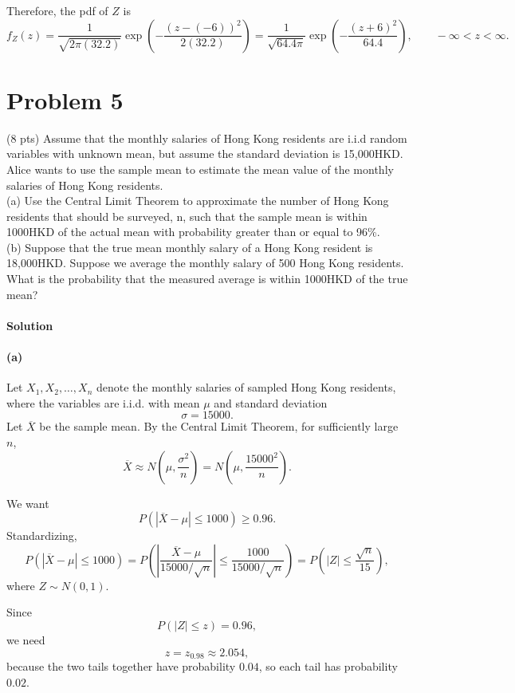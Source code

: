 \documentclass[a4paper,10pt]{article}
\begin{document}
Therefore, the pdf of $Z$ is
\[
f_Z(z)=\frac{1}{\sqrt{2\pi(32.2)}}
\exp\left(-\frac{(z-(-6))^2}{2(32.2)}\right)
=\frac{1}{\sqrt{64.4\pi}}
\exp\left(-\frac{(z+6)^2}{64.4}\right),
\qquad -\infty<z<\infty.
\]



\section{Problem 5}\label{pro:5}
(8 pts) Assume that the monthly salaries of Hong Kong residents are i.i.d random variables
with unknown mean, but assume the standard deviation is 15,000HKD. Alice wants to use the
sample mean to estimate the mean value of the monthly salaries of Hong Kong residents.\\
(a) Use the Central Limit Theorem to approximate the number of Hong Kong residents that
should be surveyed, n, such that the sample mean is within 1000HKD of the actual mean
with probability greater than or equal to 96\%.\\
(b) Suppose that the true mean monthly salary of a Hong Kong resident is 18,000HKD.
Suppose we average the monthly salary of 500 Hong Kong residents. What is the
probability that the measured average is within 1000HKD of the true mean?
\paragraph{Solution}
\paragraph{(a)}
Let $X_1, X_2, \dots, X_n$ denote the monthly salaries of sampled Hong Kong residents, where the variables are i.i.d. with mean $\mu$ and standard deviation
\[
\sigma = 15000.
\]
Let $\overline{X}$ be the sample mean. By the Central Limit Theorem, for sufficiently large $n$,
\[
\overline{X} \approx N\left(\mu,\frac{\sigma^2}{n}\right)
= N\left(\mu,\frac{15000^2}{n}\right).
\]

We want
\[
P\left(|\overline{X}-\mu|\le 1000\right)\ge 0.96.
\]
Standardizing,
\[
P\left(|\overline{X}-\mu|\le 1000\right)
=
P\left(
\left|
\frac{\overline{X}-\mu}{15000/\sqrt{n}}
\right|
\le
\frac{1000}{15000/\sqrt{n}}
\right)
=
P\left(|Z|\le \frac{\sqrt{n}}{15}\right),
\]
where $Z\sim N(0,1)$.

Since
\[
P(|Z|\le z)=0.96,
\]
we need
\[
z=z_{0.98}\approx 2.054,
\]
because the two tails together have probability $0.04$, so each tail has probability $0.02$.
\end{document}
